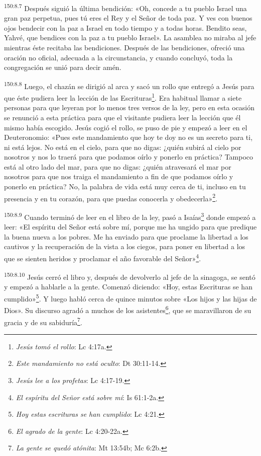 \par 
\textsuperscript{150:8.7} Después siguió la última bendición: «Oh, concede a tu pueblo Israel una gran paz perpetua, pues tú eres el Rey y el Señor de toda paz. Y ves con buenos ojos bendecir con la paz a Israel en todo tiempo y a todas horas. Bendito seas, Yahvé, que bendices con la paz a tu pueblo Israel». La asamblea no miraba al jefe mientras éste recitaba las bendiciones. Después de las bendiciones, ofreció una oración no oficial, adecuada a la circunstancia, y cuando concluyó, toda la congregación se unió para decir amén.

\par 
\textsuperscript{150:8.8} Luego, el chazán se dirigió al arca y sacó un rollo que entregó a Jesús para que éste pudiera leer la lección de las Escrituras\footnote{\textit{Jesús tomó el rollo}: Lc 4:17a.}. Era habitual llamar a siete personas para que leyeran por lo menos tres versos de la ley, pero en esta ocasión se renunció a esta práctica para que el visitante pudiera leer la lección que él mismo había escogido. Jesús cogió el rollo, se puso de pie y empezó a leer en el Deuteronomio: «Pues este mandamiento que hoy te doy no es un secreto para ti, ni está lejos. No está en el cielo, para que no digas: ¿quién subirá al cielo por nosotros y nos lo traerá para que podamos oírlo y ponerlo en práctica? Tampoco está al otro lado del mar, para que no digas: ¿quién atravesará el mar por nosotros para que nos traiga el mandamiento a fin de que podamos oírlo y ponerlo en práctica? No, la palabra de vida está muy cerca de ti, incluso en tu presencia y en tu corazón, para que puedas conocerla y obedecerla»\footnote{\textit{Este mandamiento no está oculto}: Dt 30:11-14.}.

\par 
\textsuperscript{150:8.9} Cuando terminó de leer en el libro de la ley, pasó a Isaías\footnote{\textit{Jesús lee a los profetas}: Lc 4:17-19.} donde empezó a leer: «El espíritu del Señor está sobre mí, porque me ha ungido para que predique la buena nueva a los pobres. Me ha enviado para que proclame la libertad a los cautivos y la recuperación de la vista a los ciegos, para poner en libertad a los que se sienten heridos y proclamar el año favorable del Señor»\footnote{\textit{El espíritu del Señor está sobre mí}: Is 61:1-2a.}.

\par 
\textsuperscript{150:8.10} Jesús cerró el libro y, después de devolverlo al jefe de la sinagoga, se sentó y empezó a hablarle a la gente. Comenzó diciendo: «Hoy, estas Escrituras se han cumplido»\footnote{\textit{Hoy estas escrituras se han cumplido}: Lc 4:21.}. Y luego habló cerca de quince minutos sobre «Los hijos y las hijas de Dios». Su discurso agradó a muchos de los asistentes\footnote{\textit{El agrado de la gente}: Lc 4:20-22a.}, que se maravillaron de su gracia y de su sabiduría\footnote{\textit{La gente se quedó atónita}: Mt 13:54b; Mc 6:2b.}.

